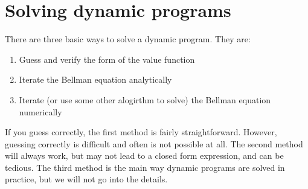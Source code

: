 \section{Solving dynamic programs} 

There are three basic ways to solve a dynamic program. They are:
\begin{enumerate}
\item Guess and verify the form of the value function
\item Iterate the Bellman equation analytically
\item Iterate (or use some other alogirthm to solve)  the Bellman equation numerically
\end{enumerate}
If you guess correctly, the first method is fairly
straightforward. However, guessing correctly is difficult and often is
not possible at all. The second method will always work, but may not
lead to a closed form expression, and can be tedious. The third method
is the main way dynamic programs are solved in practice, but we will
not go into the details.

